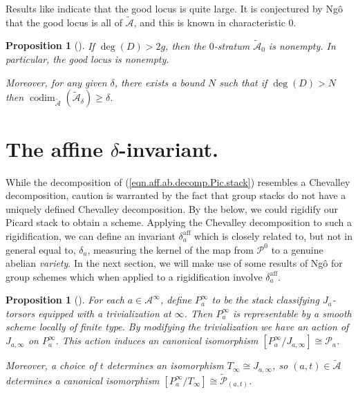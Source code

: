 \documentclass[openany]{amsbook}
\newtheorem{proposition}[theorem]{Proposition}
\theoremstyle{definition}
\theoremstyle{remark}
\numberwithin{equation}{section}
\newcommand{\cA}{\mathcal{A}}
\newcommand{\cP}{\mathcal{P}}
\renewcommand{\-}{\operatorname{-}}
\newcommand{\on}[1]{\operatorname{#1}}
\newcommand{\ctA}{\widetilde{\cA}}
\newcommand{\ctP}{\widetilde{\cP}}
\newcommand{\aff}{\mathrm{aff}}
\newcommand{\codim}{\on{codim}}
\begin{document}
Results like \cite[Th\'eor\`eme 6.1.3]{CLII} indicate that the good locus is quite large. It is conjectured by Ng\^{o} that the good locus is all of $\ctA$, and this is known in characteristic 0.

\begin{proposition}[{{\cite[Lemme 5.6.4, Proposition 5.7.2]{ngofl}}}]
    If $\deg(D) > 2g$, then the $0$-stratum $\ctA_0$ is nonempty. In particular, the good locus is nonempty. 

    Moreover, for any given $\delta$, there exists a bound $N$ such that if $\deg(D) > N$ then $\codim_{\ctA}(\ctA_{\delta}) \ge \delta$.
\end{proposition}



    


\section{\texorpdfstring{The affine $\delta$-invariant.}{The affine delta-invariant.}}\label{subsect.aff.delta.inv}

While the decomposition of (\ref{eqn.aff.ab.decomp.Pic.stack}) resembles a Chevalley decomposition, caution is warranted by the fact that group stacks do not have a uniquely defined Chevalley decomposition. By the below, we could rigidify our Picard stack to obtain a scheme. Applying the Chevalley decomposition to such a rigidification, we can define an invariant $\delta_a^{\aff}$ which is closely related to, but not in general equal to, $\delta_a$, measuring the kernel of the map from $\cP^0$ to a genuine abelian \textit{variety}. In the next section, we will make use of some results of Ng\^{o} for group schemes which when applied to a rigidification involve $\delta_a^{\aff}$.

\begin{proposition}[{{\cite[Proposition 4.5.7]{ngofl}}}]\label{prop.pic.stack.rigidification}
    For each $a \in \cA^\infty$, define $P^\infty_a$ to be the stack classifying $J_a$-torsors equipped with a trivialization at $\infty$. Then $P^\infty_a$ is representable by a smooth scheme locally of finite type. By modifying the trivialization we have an action of $J_{a,\infty}$ on $P^{\infty}_a$. This action induces an canonical isomorphism $[P_a^\infty / J_{a,\infty}] \cong \cP_a$.
    
    Moreover, a choice of $t$ determines an isomorphism $T_\infty \cong J_{a,\infty}$, so $(a,t) \in \ctA$ determines a canonical isomorphism $[P_a^\infty / T_{\infty}] \cong \ctP_{(a,t)}$.
\end{proposition}
\end{document}
